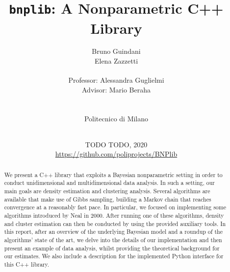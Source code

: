 \documentclass[a4paper]{report}
\title{\texttt{bnplib}: A Nonparametric C++ Library}
\author{
Bruno Guindani \\
Elena Zazzetti \\
\\
Professor: Alessandra Guglielmi \\
Advisor: Mario Beraha \\
\\
\\
Politecnico di Milano \\
\\
}
\date{
TODO TODO, 2020
\\[250pt]
{\color{gray} {\url{https://github.com/poliprojects/BNPlib}}}
}
\begin{document}
\maketitle

\newpage\phantom{a}

\thispagestyle{empty}
\begin{abstract}
We present a C++ library that exploits a Bayesian nonparametric setting in order to conduct unidimensional and multidimensional data analysis.
In such a setting, our main goals are density estimation and clustering analysis.
Several algorithms are available that make use of Gibbs sampling, building a Markov chain that reaches convergence at a reasonably fast pace.
In particular, we focused on implementing some algorithms introduced by Neal in 2000.
After running one of these algorithms, density and cluster estimation can then be conducted by using the provided auxiliary tools.
In this report, after an overview of the underlying Bayesian model and a roundup of the algorithms' state of the art, we delve into the details of our implementation and then present an example of data analysis, whilst providing the theoretical background for our estimates.
We also include a description for the implemented Python interface for this C++ library.
\end{abstract}
\setcounter{page}{4}

\tableofcontents















\end{document}
